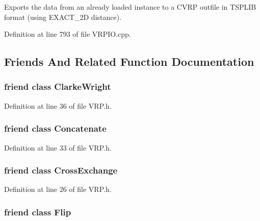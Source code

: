 Exports the data from an already loaded instance to a CVRP outfile in TSPLIB format (using EXACT\_\-2D distance).



Definition at line 793 of file VRPIO.cpp.



\subsection{Friends And Related Function Documentation}
\hypertarget{class_v_r_p_af4ac00f95018bc06be8f4ae5e19b3357}{
\subsubsection[{ClarkeWright}]{\setlength{\rightskip}{0pt plus 5cm}friend class {\bf ClarkeWright}}}
\label{class_v_r_p_af4ac00f95018bc06be8f4ae5e19b3357}


Definition at line 36 of file VRP.h.

\hypertarget{class_v_r_p_a297dde4c15143a11faf5fbaec854461c}{
\subsubsection[{Concatenate}]{\setlength{\rightskip}{0pt plus 5cm}friend class {\bf Concatenate}}}
\label{class_v_r_p_a297dde4c15143a11faf5fbaec854461c}


Definition at line 33 of file VRP.h.

\hypertarget{class_v_r_p_ab4edeb2c24ce03a58fd64a672344879d}{
\subsubsection[{CrossExchange}]{\setlength{\rightskip}{0pt plus 5cm}friend class {\bf CrossExchange}}}
\label{class_v_r_p_ab4edeb2c24ce03a58fd64a672344879d}


Definition at line 26 of file VRP.h.

\hypertarget{class_v_r_p_a01b574361116f8cdbdee667c2f0c7068}{
\subsubsection[{Flip}]{\setlength{\rightskip}{0pt plus 5cm}friend class {\bf Flip}}}
\label{class_v_r_p_a01b574361116f8cdbdee667c2f0c7068}



